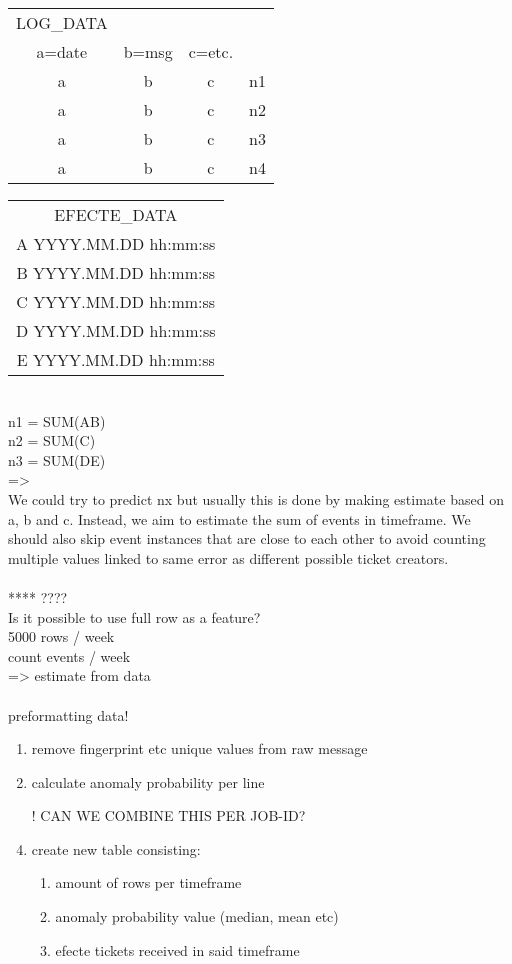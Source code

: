 \documentclass[english, 12pt, a4paper, elec, utf8, a-1b, online]{aaltothesis}
\begin{document}
\begin{tabular}{cccc}
  LOG\_DATA \\
  a=date & b=msg & c=etc. & \\
  a & b & c & n1 \\
  a & b & c & n2 \\
  a & b & c & n3 \\
  a & b & c & n4
\end{tabular}
\begin{tabular}{c}
  EFECTE\_DATA \\
  A YYYY.MM.DD hh:mm:ss \\
  B YYYY.MM.DD hh:mm:ss \\
  C YYYY.MM.DD hh:mm:ss \\
  D YYYY.MM.DD hh:mm:ss \\
  E YYYY.MM.DD hh:mm:ss
\end{tabular}
\\
n1 = SUM(AB) \\
n2 = SUM(C) \\
n3 = SUM(DE) \\
=> \\
We could try to predict nx
but usually this is done
by making estimate based on
a, b and c.
Instead,
we aim to estimate the sum of events
in timeframe.
We should also skip event instances
that are close to each other
to avoid counting multiple values
linked to same error
as different possible ticket creators.
\\ \\
**** ???? \\
Is it possible to use full row as a feature? \\
5000 rows / week \\
count events / week \\
=> estimate from data \\
\\
preformatting data! \\
\begin{enumerate}
  \item remove fingerprint etc unique values from raw message
  \item calculate anomaly probability per line
  \item [!] CAN WE COMBINE THIS PER JOB-ID?
  \item create new table consisting:
  \begin{enumerate}
    \item amount of rows per timeframe
    \item anomaly probability value (median, mean etc)
    \item efecte tickets received in said timeframe
  \end{enumerate}
\end{enumerate}
\end{document}
